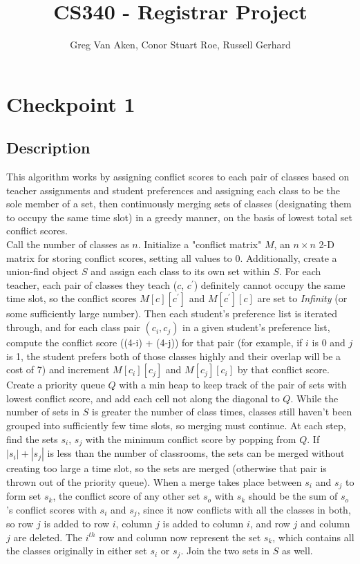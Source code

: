 \documentclass[11pt, oneside]{article}   	%
\title{CS340 - Registrar Project}
\author{Greg Van Aken, Conor Stuart Roe, Russell Gerhard}
\begin{document}
\maketitle

\section{Checkpoint 1}
\subsection{Description}
This algorithm works by assigning conflict scores to each pair of classes based on teacher assignments and student preferences and assigning each class to be the sole member of a set, then continuously merging sets of classes (designating them to occupy the same time slot) in a greedy manner, on the basis of lowest total set conflict scores. \\

Call the number of classes as $n$. Initialize a "conflict matrix" $M$, an $n \times n$ 2-D matrix for storing conflict scores, setting all values to 0. Additionally, create a union-find object $S$ and assign each class to its own set within $S$. For each teacher, each pair of classes they teach ($c$, $c^\prime$) definitely cannot occupy the same time slot, so the conflict scores $M[c][c^\prime]$ and $M[c^\prime][c]$ are set to {\it Infinity} (or some sufficiently large number). Then each student's preference list is iterated through, and for each class pair $(c_i, c_j)$ in a given student's preference list, compute the conflict score ((4-i) + (4-j)) for that pair (for example, if $i$ is 0 and $j$ is 1, the student prefers both of those classes highly and their overlap will be a cost of 7) and increment $M[c_i][c_j]$ and $M[c_j][c_i]$ by that conflict score. \\

Create a priority queue $Q$ with a min heap to keep track of the pair of sets with lowest conflict score, and add each cell not along the diagonal to $Q$. While the number of sets in $S$ is greater the number of class times, classes still haven't been grouped into sufficiently few time slots, so merging must continue. At each step, find the sets $s_i$, $s_j$ with the minimum conflict score by popping from $Q$. If $|s_i| + |s_j|$ is less than the number of classrooms, the sets can be merged without creating too large a time slot, so the sets are merged (otherwise that pair is thrown out of the priority queue). When a merge takes place between $s_i$ and $s_j$ to form set $s_k$, the conflict score of any other set $s_o$ with $s_k$ should be the sum of $s_o$'s conflict scores with $s_i$ and $s_j$, since it now conflicts with all the classes in both, so row $j$ is added to row $i$, column $j$ is added to column $i$, and row $j$ and column $j$ are deleted. The $i^{th}$ row and column now represent the set $s_k$, which contains all the classes originally in either set $s_i$ or $s_j$. Join the two sets in $S$ as well.
\end{document}
